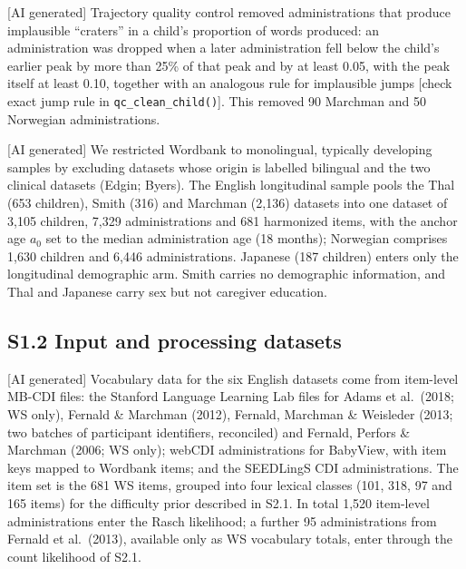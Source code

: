 [AI generated] Trajectory quality control removed administrations that produce
implausible ``craters'' in a child's proportion of words produced: an
administration was dropped when a later administration fell below the child's
earlier peak by more than 25\% of that peak and by at least 0.05, with the peak
itself at least 0.10, together with an analogous rule for implausible jumps
[check exact jump rule in \texttt{qc\_clean\_child()}]. This removed 90 Marchman
and 50 Norwegian administrations.

[AI generated] We restricted Wordbank to monolingual, typically developing
samples by excluding datasets whose origin is labelled bilingual and the two
clinical datasets (Edgin; Byers). The English longitudinal sample pools the Thal
(653 children), Smith (316) and Marchman (2,136) datasets into one dataset of
3,105 children, 7,329 administrations and 681 harmonized items, with the anchor
age $a_0$ set to the median administration age (18 months); Norwegian comprises
1,630 children and 6,446 administrations. Japanese (187 children) enters only the
longitudinal demographic arm. Smith carries no demographic information, and Thal
and Japanese carry sex but not caregiver education.

\subsection*{S1.2 Input and processing datasets}

[AI generated] Vocabulary data for the six English datasets come from item-level
MB-CDI files: the Stanford Language Learning Lab files for Adams et al.\ (2018;
WS only), Fernald \& Marchman (2012), Fernald, Marchman \& Weisleder (2013; two
batches of participant identifiers, reconciled) and Fernald, Perfors \& Marchman
(2006; WS only); webCDI administrations for BabyView, with item keys mapped to
Wordbank items; and the SEEDLingS CDI administrations. The item set is the 681 WS
items, grouped into four lexical classes (101, 318, 97 and 165 items) for the
difficulty prior described in S2.1. In total 1,520 item-level administrations enter
the Rasch likelihood; a further 95 administrations from Fernald et al.\ (2013),
available only as WS vocabulary totals, enter through the count likelihood of
S2.1.

